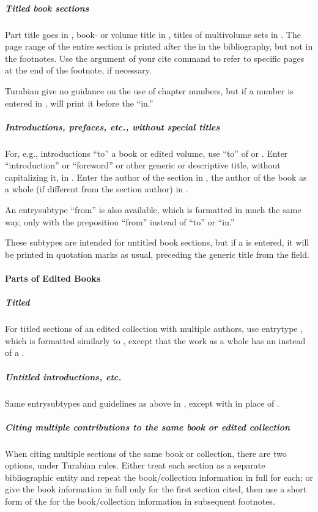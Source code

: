 \documentclass{ltxdockit}[2010/02/12]
\begin{document}
\subparagraph{Titled book sections}
Part title goes in , book- or volume title in , titles of multivolume sets in . The page range of the entire section is printed after the  in the bibliography, but not in the footnotes.\autocites[][]{255}
Use the  argument of your cite command to refer to specific pages at the end of the footnote, if necessary. 

Turabian give no guidance on the use of chapter numbers, but if a number is entered in ,  will print it before the ``in.''

\subparagraph{Introductions, prefaces, etc., without special titles\label{inbookforw}}
For, e.g., introductions ``to'' a book or edited volume, use  ``to'' of  or . 
Enter ``introduction'' or ``foreword'' or other generic or descriptive title, without capitalizing it, in . 
Enter the author of the section in , the author of the book as a whole (if different from the section author) in .\autocites[][]{696}

An entrysubtype ``from'' is also available, which is formatted in much the same way, only with the preposition ``from'' instead of ``to'' or ``in.''\autocites[][]{2743}

These subtypes are intended for untitled book sections, but if a  is entered, it will be printed in quotation marks as usual, preceding the generic title from the  field.\autocites{2743t}

\paragraph{Parts of Edited Books}
\subparagraph{Titled}
For titled sections of an edited collection with multiple authors, use entrytype , which is formatted similarly to , except that the work as a whole has an  instead of a .\autocites[][74-5]{1100} 
\subparagraph{Untitled introductions, etc.}
Same entrysubtypes and guidelines as above in , except with  in place of .


\subparagraph{Citing multiple contributions to the same book or edited collection}\label{incollxref}
When citing multiple sections of the same book or collection, there are two options, under Turabian rules. Either treat each section as a separate bibliographic entity and repeat the book/collection information in full for each; or give the book information in full only for the first section cited, then use a short form of the for the book/collection information in subsequent footnotes.
\end{document}
